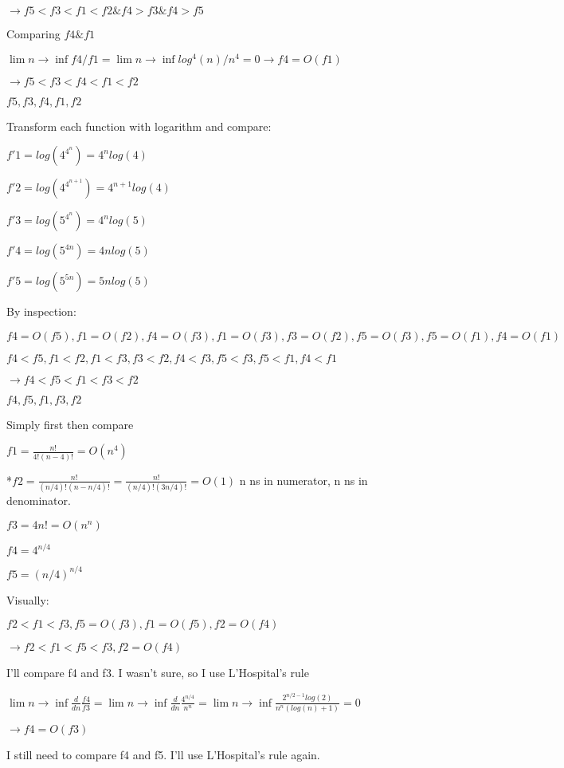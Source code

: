\documentclass[12pt,twoside]{article}
\begin{document}
\begin{problems}
\begin{problemparts}
$ \rightarrow f5 < f3 < f1 < f2 \& f4 > f3 \& f4 > f5 $

Comparing $f4 \& f1$

$ \lim n \rightarrow \inf f4/f1 = \lim n \rightarrow \inf log^{4}(n) / n^{4} = 0 \rightarrow f4 = O(f1) $

$ \rightarrow f5 < f3 < f4 < f1 < f2$

$f5, f3, f4, f1, f2$

\problempart  %
Transform each function with logarithm and compare:

$f'1 = log(4^{4^{n}}) = 4^{n}log(4)$

$f'2 = log(4^{4^{n + 1}}) = 4^{n+1}log(4)$

$f'3 = log(5^{4^{n}}) = 4^{n}log(5)$

$f'4 = log(5^{4n}) = 4nlog(5)$

$f'5 = log(5^{5n})= 5nlog(5)$

By inspection:

$ f4 = O(f5), f1 = O(f2), f4 = O(f3), f1 = O(f3), f3 = O(f2), f5 = O(f3), f5 = O(f1), f4 = O(f1) $

$ f4 < f5, f1 < f2, f1 < f3, f3 < f2, f4 < f3, f5 < f3, f5 < f1, f4 < f1$

$ \rightarrow f4 < f5 < f1 < f3 < f2$

$ f4, f5, f1, f3, f2$

\problempart  Simply first then compare %

$ f1 = \frac{n!}{4!(n-4)!} = O(n^{4}) $

*$ f2 = \frac{n!}{(n/4)!(n-n/4)!} = \frac{n!}{(n/4)!(3n/4)!} = O(1)$ n ns in numerator, n ns in denominator.

$ f3 = 4n! = O(n^n)$

$ f4 = 4^{n/4} $

$ f5 = (n/4)^{n/4} $

Visually:

$ f2 < f1 < f3, f5 = O(f3), f1 = O(f5), f2 = O(f4) $

$ \rightarrow f2 < f1 < f5 < f3, f2 = O(f4) $

I'll compare f4 and f3. I wasn't sure, so I use L'Hospital's rule

$ \lim n \rightarrow \inf \frac{d}{dn} \frac{f4}{f3} = \lim n \rightarrow \inf \frac{d}{dn} \frac{4^{n/4}}{n^n} = \lim n \rightarrow \inf \frac{2^{n/2 -1}log(2)}{n^n(log(n) + 1)} = 0 $

$ \rightarrow f4 = O(f3) $

I still need to compare f4 and f5. I'll use L'Hospital's rule again.


\end{problemparts}
\end{problems}
\end{document}

